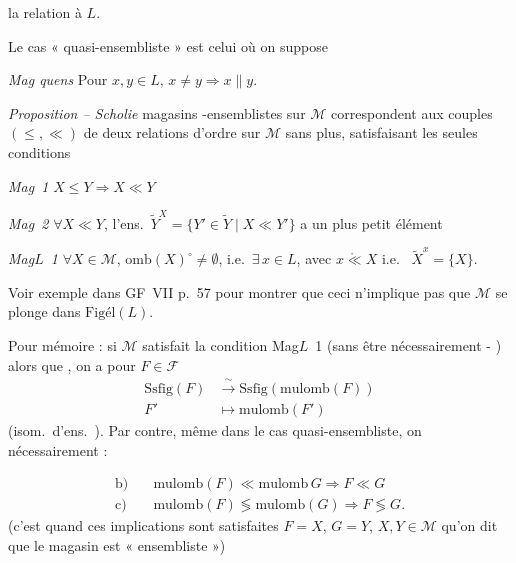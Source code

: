 \documentclass[11pt,a4paper]{article}
\begin{document}

la relation   à $L$.

Le cas « quasi-ensembliste » est celui où on suppose

\emph{Mag quens} Pour $x, y \in L$, $x \neq y \Rightarrow x \parallel y$.

\emph{Proposition -- Scholie}   magasins \struck{\ill{}} -ensemblistes sur $\mathcal{M}$ correspondent aux couples $(\leq, \ll)$ de deux relations d'ordre sur $\mathcal{M}$ sans plus, satisfaisant les seules conditions

\emph{Mag~1} $X \leq Y \Rightarrow X \ll Y$

\emph{Mag~2} $\forall X \ll Y$, l'ens.\ $\widetilde{Y}^{X} = \{ Y' \in \widetilde{Y} \mid X \ll Y' \}$ a un plus petit élément

\emph{Mag$L$~1} $\forall X \in \mathcal{M}$, $\mathrm{omb}(X)^{\circ} \neq \emptyset$, i.e.\ $\exists\, x \in L$, avec $x \mathring{\ll} X$ i.e.\  $\widetilde{X}^{x} = \{X\}$.

Voir exemple dans GF~VII p.~57 pour montrer que ceci n'implique pas que $\mathcal{M}$ se plonge dans $\mathrm{Figél}(L)$. 

Pour mémoire : si $\mathcal{M}$ satisfait la condition Mag$L$~1 (sans être nécessairement -\struck{\ill{}} ) alors que  \ill{}, on a pour $F \in \mathcal{F}$
\[
\begin{aligned}
  \mathrm{Ssfig}(F) &\xrightarrow{\;\sim\;} \mathrm{Ssfig}(\mathrm{mulomb}(F)) \\
  F' &\longmapsto \mathrm{mulomb}(F')
\end{aligned}
\]
(isom.\ d'ens.\ ). Par contre, même dans le cas quasi-ensembliste, on \struck{\ill{}}  nécessairement :

\[
\begin{aligned}
  \text{b)}\quad & \mathrm{mulomb}(F) \ll \mathrm{mulomb}\, G \Longrightarrow F \ll G \\
  \text{c)}\quad & \mathrm{mulomb}(F) \lessgtr \mathrm{mulomb}(G) \Longrightarrow F \lessgtr G .
\end{aligned}
\]
(c'est quand ces  implications sont satisfaites   $F = X$, $G = Y$, $X, Y \in \mathcal{M}$  qu'on dit que le magasin est « ensembliste »)
\end{document}
